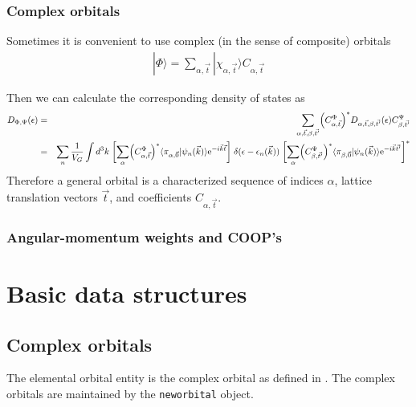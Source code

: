 \documentclass[11pt,a4paper]{report}
\begin{document}
\subsubsection{Complex orbitals}
Sometimes it is convenient to use complex (in the sense of composite)
orbitals
\begin{eqnarray}
|\Phi\rangle=\sum_{\alpha,\vec{t}}|\chi_{\alpha,\vec{t}}\rangle C_{\alpha,\vec{t}}
\label{eq:defcomplexorbital}
\end{eqnarray}

Then we can calculate the corresponding density of states
as
\begin{eqnarray}
D_{\Phi,\Psi}(\epsilon)
&=&\sum_{\alpha,\vec{t},\beta,\vec{t'}}
\Bigl(C^\Phi_{\alpha,\vec{t}}\Bigr)^*
D_{\alpha,\vec{t},\beta,\vec{t'}}(\epsilon)
C^\Psi_{\beta,\vec{t'}}
\nonumber\\
&=&
\sum_n\frac{1}{V_G}\int d^3k\; 
\biggl[\sum_\alpha \Bigl(C^\Phi_{\alpha,\vec{t}}\Bigr)^*
\langle\pi_{\alpha,\vec{0}}|\psi_n(\vec{k})\rangle
\mathrm{e}^{-i\vec{k}\vec{t}}
\biggr]
\;\delta(\epsilon-\epsilon_n(\vec{k}))\;
\biggl[\sum_\alpha 
\Bigl(C^\Psi_{\beta,\vec{t'}}\Bigr)^*
\langle\pi_{\beta,\vec{0}}|\psi_n(\vec{k})\rangle
\mathrm{e}^{-i\vec{k}\vec{t'}}
\biggr]^*
\nonumber\\
\end{eqnarray}
Therefore a general orbital is a characterized sequence of indices $\alpha$,
lattice translation vectors $\vec{t}$, and coefficients $C_{\alpha,\vec{t}}$.


\subsubsection{Angular-momentum weights and COOP's}


\section{Basic data structures}
\subsection{Complex orbitals}
The elemental orbital entity is the complex orbital as defined in
.  The complex orbitals are maintained by the
\verb|neworbital| object.
\end{document}
